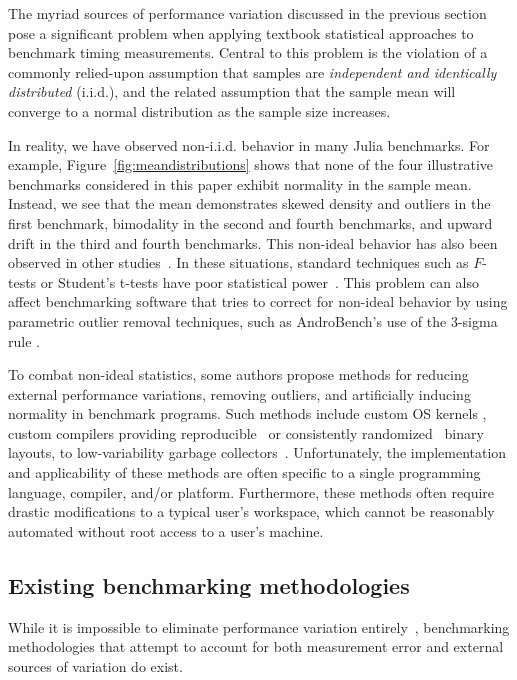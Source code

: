 \documentclass[conference]{IEEEtran}
\begin{document}
The myriad sources of performance variation discussed in the previous section pose a
significant problem when applying textbook statistical approaches to benchmark timing
measurements. Central to this problem is the violation of a commonly relied-upon assumption
that samples are \textit{independent and identically distributed} (i.i.d.), and the related
assumption that the sample mean will converge to a normal distribution as the sample size
increases.

In reality, we have observed non-i.i.d. behavior in many Julia benchmarks. For example,
Figure~\ref{fig:meandistributions} shows that none of the four illustrative benchmarks
considered in this paper exhibit normality in the sample mean. Instead, we see that the mean
demonstrates skewed density and outliers in the first benchmark, bimodality in the second
and fourth benchmarks, and upward drift in the third and fourth benchmarks. This non-ideal
behavior has also been observed in other studies~\cite{Gil2011, Chen2015,
Rehn2015,Barrett2016}. In these situations, standard techniques such as $F$-tests or
Student's t-tests have poor statistical
power~\cite{Lilja2000,Mytkowicz2009,Kalibera2013,Chen2015, Barrett2016}. This problem can
also affect benchmarking software that tries to correct for non-ideal behavior by using
parametric outlier removal techniques, such as AndroBench's use of the 3-sigma rule
\cite{Kim2012}.

To combat non-ideal statistics, some authors propose methods for reducing external
performance variations, removing outliers, and artificially inducing normality in benchmark
programs. Such methods include custom OS kernels \cite{Tessellation,Akkan2012}, custom
compilers providing reproducible~\cite{Georges2008} or consistently
randomized~\cite{Curtsinger2013} binary layouts, to low-variability garbage
collectors~\cite{Huang2004}. Unfortunately, the implementation and applicability of these
methods are often specific to a single programming language, compiler, and/or platform.
Furthermore, these methods often require drastic modifications to a typical user's
workspace, which cannot be reasonably automated without root access to a user's machine.

\subsection{Existing benchmarking methodologies}

While it is impossible to eliminate performance variation
entirely~\cite{Alcocer2015,Barrett2016}, benchmarking methodologies that attempt to account
for both measurement error and external sources of variation do exist.
\end{document}
